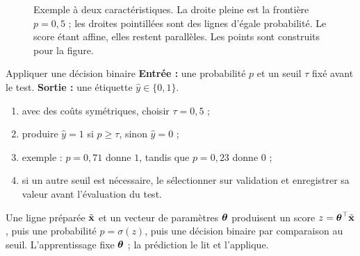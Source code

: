 \begin{figure}[htbp]
\centering
{}
\caption{Exemple à deux caractéristiques. La droite pleine est la frontière
$p=0{,}5$ ; les droites pointillées sont des lignes d'égale probabilité. Le score
étant affine, elles restent parallèles. Les points sont construits pour la
figure.}
\label{fig:boundary}
\end{figure}

\begin{procedure}{Appliquer une décision binaire}
\textbf{Entrée :} une probabilité $p$ et un seuil $\tau$ fixé avant le test.
\textbf{Sortie :} une étiquette $\widehat y\in\{0,1\}$.
\begin{enumerate}
  \item avec des coûts symétriques, choisir $\tau=0{,}5$ ;
  \item produire $\widehat y=1$ si $p\geq\tau$, sinon $\widehat y=0$ ;
  \item exemple : $p=0{,}71$ donne $1$, tandis que $p=0{,}23$ donne $0$ ;
  \item si un autre seuil est nécessaire, le sélectionner sur validation et
        enregistrer sa valeur avant l'évaluation du test.
\end{enumerate}
\end{procedure}

\begin{resultat}
Une ligne préparée $\tilde{\mathbf{x}}$ et un vecteur de paramètres $\boldsymbol{\theta}$ produisent un score
$z=\boldsymbol{\theta}^\top\tilde{\mathbf{x}}$, puis une probabilité $p=\sigma(z)$, puis une décision binaire
par comparaison au seuil. L'apprentissage fixe $\boldsymbol{\theta}$ ; la prédiction le lit et
l'applique.
\end{resultat}
